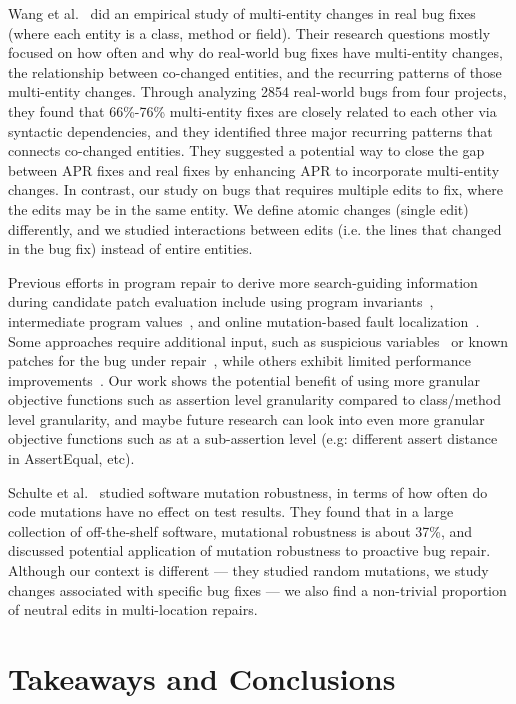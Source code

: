 \documentclass[10pt, conference]{IEEEtran}
\begin{document}
Wang et al.~\cite{wang2018} did an empirical study of multi-entity changes in real bug fixes 
(where each entity is a class, method or field). Their research questions mostly focused on 
how often and why do real-world bug fixes have multi-entity changes, the relationship 
between co-changed entities, and the recurring patterns of those multi-entity changes. 
Through analyzing 2854 real-world bugs from four projects, they found that 66\%-76\% 
multi-entity fixes are closely related to each other via syntactic dependencies, 
and they identified three major recurring patterns that connects co-changed entities. 
They suggested a potential way to close the gap between APR fixes and real fixes by 
enhancing APR to incorporate multi-entity changes. In contrast, our study on bugs that
requires multiple edits to fix, where the edits may be in the same entity. We define atomic 
changes (single edit) differently, and we studied interactions between edits 
(i.e. the lines that changed in the bug fix) instead of entire entities.

Previous efforts in program repair to derive more search-guiding information 
during candidate patch evaluation 
include using program invariants~\cite{better-fitness, dinglyu}, 
intermediate program values~\cite{source-code-checkpoint}, 
and online mutation-based fault localization~\cite{mut-analysis}.
Some approaches require additional input, such as suspicious variables~\cite{source-code-checkpoint} 
or known patches for the bug under repair~\cite{better-fitness}, 
while others exhibit limited performance improvements~\cite{dinglyu, mut-analysis}.
Our work shows the potential benefit of using more granular objective functions such as
assertion level granularity compared to class/method level granularity, and maybe
future research can look into even more granular objective functions such as at a sub-assertion
level (e.g: different assert distance in AssertEqual, etc).

Schulte et al.~\cite{schulte} studied software mutation robustness, in terms of 
how often do code mutations have no effect on test results.
They found that in a large collection of off-the-shelf software, mutational robustness is about 37\%, 
and discussed potential application of mutation robustness to proactive bug repair. Although our context is different --- they studied random mutations, we study changes associated with specific bug fixes --- we also find a non-trivial proportion of neutral edits in multi-location repairs.  


\section{Takeaways and Conclusions}
\label{sec:takeaways}
\end{document}
